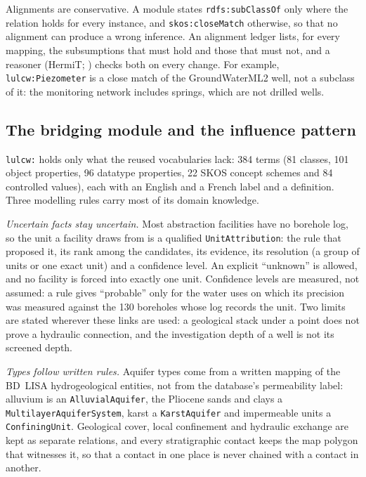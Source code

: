 Alignments are conservative. A module states \texttt{rdfs:subClassOf} only where the relation holds
for every instance, and \texttt{skos:closeMatch} otherwise, so that no alignment can produce a wrong
inference. An alignment ledger lists, for every mapping, the subsumptions that must hold and those
that must not, and a reasoner (HermiT; \citealp{Glimm2014Hermit})
checks both on every change. For example, \texttt{lulcw:Piezometer} is a close match of the
GroundWaterML2 well, not a subclass of it: the monitoring network includes springs, which are not
drilled wells.

\subsection{The bridging module and the influence pattern}\label{sec:kg-module}

\texttt{lulcw:} holds only what the reused vocabularies lack: 384 terms (81 classes, 101 object
properties, 96 datatype properties, 22 SKOS concept schemes and 84 controlled values), each with an
English and a French label and a definition. Three modelling rules carry most of its domain
knowledge.

\emph{Uncertain facts stay uncertain.} Most abstraction facilities have no borehole log, so the
unit a facility draws from is a qualified \texttt{UnitAttribution}: the rule that proposed it, its
rank among the candidates, its evidence, its resolution (a group of units or one exact unit) and a
confidence level. An explicit ``unknown'' is allowed, and no facility is forced into exactly
one unit. Confidence levels are measured, not assumed: a rule gives ``probable'' only for the
water uses on which its precision was measured against the 130 boreholes whose log records the
unit. Two limits are stated wherever these links are used: a geological stack under a point does
not prove a hydraulic connection, and the investigation depth of a well is not its screened depth.

\emph{Types follow written rules.} Aquifer types come from a written mapping of the BD~LISA
hydrogeological entities, not from the database's permeability label: alluvium is an
\texttt{AlluvialAquifer}, the Pliocene sands and clays a \texttt{MultilayerAquiferSystem}, karst a
\texttt{KarstAquifer} and impermeable units a \texttt{ConfiningUnit}. Geological cover, local
confinement and hydraulic exchange are kept as separate relations, and every stratigraphic
contact keeps the map polygon that witnesses it, so that a contact in one place is never chained
with a contact in another.

